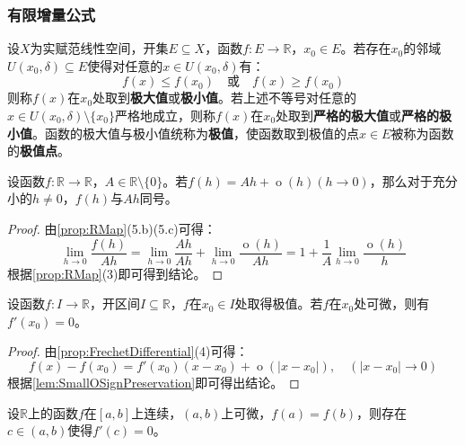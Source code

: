 \subsubsection{有限增量公式}
\begin{definition}
	设$X$为实赋范线性空间，开集$E\subseteq X$，函数$f:E\to\mathbb{R}$，$x_0\in E$。若存在$x_0$的邻域$U(x_0,\delta)\subseteq E$使得对任意的$x\in U(x_0,\delta)$有：
	\begin{equation*}
		f(x)\leqslant f(x_0)\quad\text{或}\quad f(x)\geqslant f(x_0)
	\end{equation*}
	则称$f(x)$在$x_0$处取到\textbf{极大值}或\textbf{极小值}。若上述不等号对任意的$x\in U(x_0,\delta)\setminus\{x_0\}$严格地成立，则称$f(x)$在$x_0$处取到\textbf{严格的极大值}或\textbf{严格的极小值}。函数的极大值与极小值统称为\textbf{极值}，使函数取到极值的点$x\in E$被称为函数的\textbf{极值点}。
\end{definition}
\begin{lemma}\label{lem:SmallOSignPreservation}
	设函数$f:\mathbb{R}\to\mathbb{R}$，$A\in\mathbb{R}\setminus\{0\}$。若$f(h)=Ah+\operatorname{o}(h)(h\to0)$，那么对于充分小的$h\ne0$，$f(h)$与$Ah$同号。
\end{lemma}
\begin{proof}
	由\cref{prop:RMap}(5.b)(5.c)可得：
	\begin{equation*}
		\lim_{h\to0}\frac{f(h)}{Ah}=\lim_{h\to0}\frac{Ah}{Ah}+\lim_{h\to0}\frac{\operatorname{o}(h)}{Ah}=1+\frac{1}{A}\lim_{h\to0}\frac{\operatorname{o}(h)}{h}
	\end{equation*}
	根据\cref{prop:RMap}(3)即可得到结论。
\end{proof}
\begin{theorem}\label{theo:FermatTheorem}
	设函数$f:I\to\mathbb{R}$，开区间$I\subseteq\mathbb{R}$，$f$在$x_0\in I$处取得极值。若$f$在$x_0$处可微，则有$f'(x_0)=0$。
\end{theorem}
\begin{proof}
	由\cref{prop:FrechetDifferential}(4)可得：
	\begin{equation*}
		f(x)-f(x_0)=f'(x_0)(x-x_0)+\operatorname{o}(|x-x_0|),\quad(|x-x_0|\to0)
	\end{equation*}
	根据\cref{lem:SmallOSignPreservation}即可得出结论。
\end{proof}
\begin{theorem}\label{theo:RolleTheorem}
	设$\mathbb{R}$上的函数$f$在$[a,b]$上连续，$(a,b)$上可微，$f(a)=f(b)$，则存在$c\in(a,b)$使得$f'(c)=0$。
\end{theorem}
